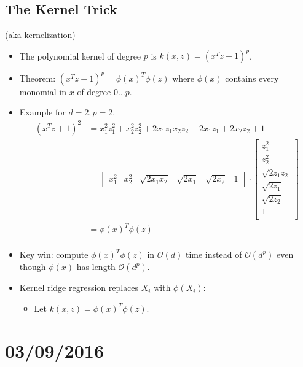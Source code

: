 \documentclass[10pt]{article}
\begin{document}
	\subsection*{The Kernel Trick} (aka \underline{kernelization})
	\
	\begin{itemize}
		\item The \underline{polynomial kernel} of degree $p$ is $k(x,z) = (x^{T}z + 1)^{p}$.
		\item Theorem: $(x^{T}z + 1)^{p} = \phi(x)^{T}\phi(z)$ where $\phi(x)$ contains every monomial in $x$ of degree $0 \dots p$.
		\item Example for $d=2, p=2$.
			\begin{align*}
				(x^{T}z+1)^{2} &= x_{1}^{2}z_{1}^{2} + x_{2}^{2}z_{2}^{2} + 2x_{1}z_{1}x_{2}z_{2} + 2x_{1}z_{1} + 2x_{2}z_{2} + 1\\
					& = \begin{bmatrix}
						x_{1}^{2} & x_{2}^{2} & \sqrt{2x_{1}x_{2}} & \sqrt{2x_{1}} & \sqrt{2x_{2}} & 1
					\end{bmatrix}
					\cdot
					\begin{bmatrix}
						z_{1}^{2}\\
						z_{2}^{2}\\
						\sqrt{2z_{1}z_{2}}\\
						\sqrt{2z_{1}}\\
						\sqrt{2z_{2}}\\
						1\\
					\end{bmatrix}\\
					&= \phi(x)^{T} \phi(z)\\
			\end{align*}
		\item Key win: compute $\phi(x)^{T} \phi(z)$ in $\mathcal{O}(d)$ time instead of $\mathcal{O}(d^{p})$ even though $\phi(x)$ has length $\mathcal{O}(d^{p})$.
		\item Kernel ridge regression replaces $X_{i}$ with $\phi(X_{i})$:
			\begin{itemize}
				\item Let $k(x, z) = \phi(x)^{T}\phi(z)$.	
			\end{itemize} 
	\end{itemize}


\newpage
\section*{03/09/2016}
\end{document}
